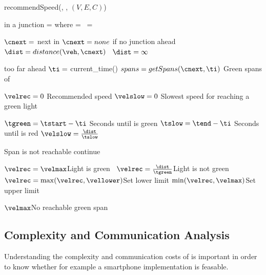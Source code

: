 \begin{algorithm}
\caption{recommendSpeed(\veh, \route, $(V, E, C)$)}\label{alg.recommendedSpeed}
\begin{algorithmic}[1]
 \Comment \veh in a junction\label{alg:recSpeed:injunction}
\State\velmax= \espeed where \eend=\vehposstart
\Else\ \velmax = \vehposspeed
\EndIf\label{alg:recSpeed:injunctionEnd}

\State $\cnext= $ next \con in \route\Comment $\cnext=none$ if no junction ahead \label{alg:recSpeed:cnext}
\ $\dist=distance(\veh,\cnext)$ \label{alg:recSpeed:distance}
\Else\ $\dist = \infty$\label{alg:recSpeed:dinfty}
\EndIf

 \Return \velmax\Comment \cnext too far ahead\label{alg:recSpeed:dmax}
\EndIf
\State $\ti=$ current\_time()\label{alg:recSpeed:ti}
\State $spans = getSpans(\cnext, \ti)$ \Comment Green spans of \cnext \label{alg:recSpeed:getSpan}

\State $\velrec = 0$ \Comment Recommended speed \label{alg:recSpeed:velrec}
\State $\velslow = 0$ \Comment Slowest speed for reaching a green light \label{alg:recSpeed:velslow}

\label{alg:recSpeed:loopSpans}
\State $\tgreen = \tstart - \ti$ \Comment Seconds until \cnextphase is green \label{alg:recSpeed:tg}
\State $\tslow = \tend - \ti$ \Comment Seconds until \cnextphase is red\label{alg:recSpeed:tr}
\State $\velslow = \frac{\dist}{\tslow}$\label{alg:recSpeed:hr}

\State\Comment Span is not reachable
\If{$\velslow > \velmax$} continue\label{alg:recSpeed:continue}
\EndIf

 $\velrec=\velmax$\Comment Light is green\label{alg:recSpeed:green}
\Else\ $\velrec = \frac{\dist}{\tgreen}$\Comment Light is not green\label{alg:recSpeed:h}
\EndIf
\State $\velrec = \max(\velrec, \vellower)$\Comment Set lower limit\label{alg:recSpeed:lowerLimit}
\State\Return $\min(\velrec, \velmax)$\Comment Set upper limit\label{alg:recSpeed:returnh}
\EndFor\label{alg:recSpeed:loopSpansEnd}

\State\Return $\velmax$\Comment No reachable green span\label{alg:recSpeed:returnmax}
\end{algorithmic}
\end{algorithm}

\subsection{Complexity and Communication Analysis}
Understanding the complexity and communication costs of \tech is important in order to know whether for example a smartphone implementation is feasable.

